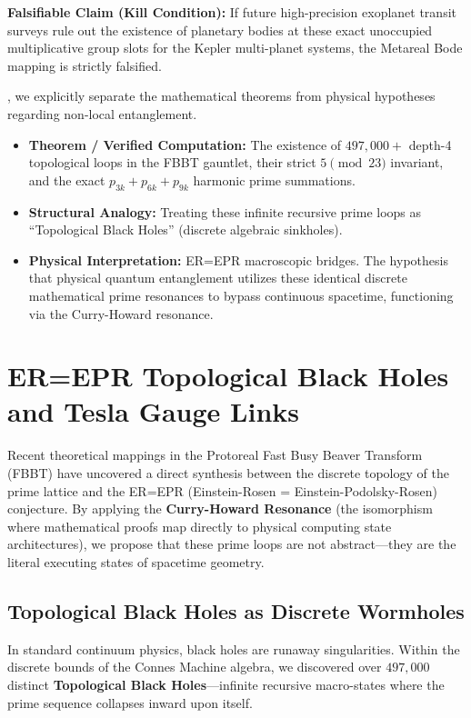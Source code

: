 \textbf{Falsifiable Claim (Kill Condition):} If future high-precision exoplanet transit surveys rule out the existence of planetary bodies at these exact unoccupied multiplicative group slots for the Kepler multi-planet systems, the Metareal Bode mapping is strictly falsified.

, we explicitly separate the mathematical theorems from physical hypotheses regarding non-local entanglement.
\begin{itemize}[noitemsep]
    \item \textbf{Theorem / Verified Computation:} The existence of $497,000+$ depth-4 topological loops in the FBBT gauntlet, their strict $5 \pmod{23}$ invariant, and the exact $p_{3k} + p_{6k} + p_{9k}$ harmonic prime summations.
    \item \textbf{Structural Analogy:} Treating these infinite recursive prime loops as ``Topological Black Holes'' (discrete algebraic sinkholes).
    \item \textbf{Physical Interpretation:} ER=EPR macroscopic bridges. The hypothesis that physical quantum entanglement utilizes these identical discrete mathematical prime resonances to bypass continuous spacetime, functioning via the Curry-Howard resonance.
\end{itemize}

\section{ER=EPR Topological Black Holes and Tesla Gauge Links}

Recent theoretical mappings in the Protoreal Fast Busy Beaver Transform (FBBT) have uncovered a direct synthesis between the discrete topology of the prime lattice and the ER=EPR (Einstein-Rosen = Einstein-Podolsky-Rosen) conjecture. By applying the \textbf{Curry-Howard Resonance} (the isomorphism where mathematical proofs map directly to physical computing state architectures), we propose that these prime loops are not abstract---they are the literal executing states of spacetime geometry.

\subsection{Topological Black Holes as Discrete Wormholes}
In standard continuum physics, black holes are runaway singularities. Within the discrete bounds of the Connes Machine algebra, we discovered over $497,000$ distinct \textbf{Topological Black Holes}---infinite recursive macro-states where the prime sequence collapses inward upon itself. 

